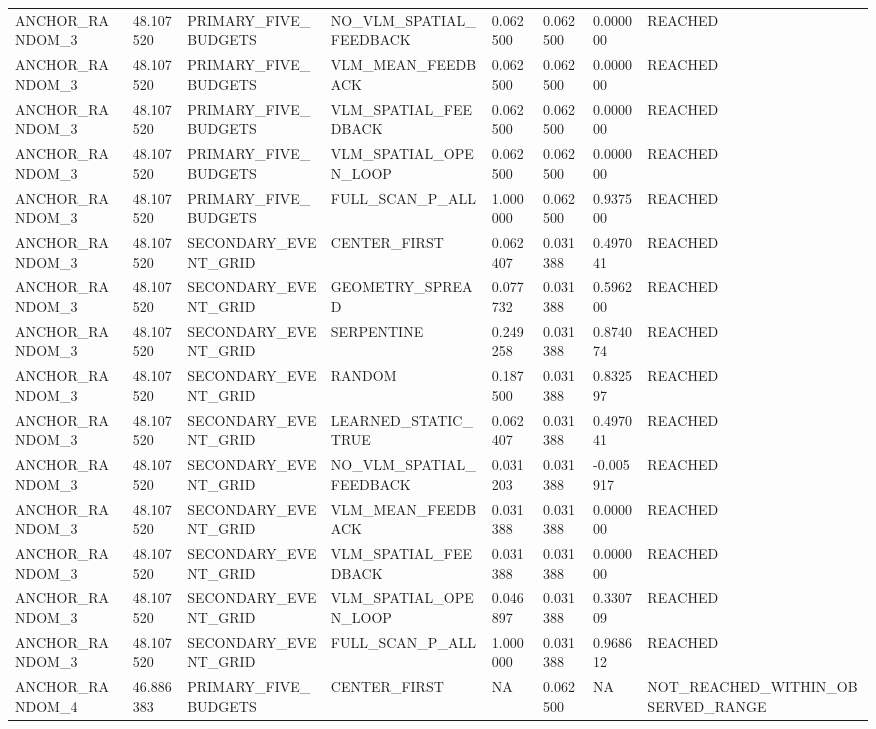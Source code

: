 \begin{tabular}{llllllll}
ANCHOR\_RANDOM\_3 & 48.107520 & PRIMARY\_FIVE\_BUDGETS & NO\_VLM\_SPATIAL\_FEEDBACK & 0.062500 & 0.062500 & 0.000000 & REACHED \\
ANCHOR\_RANDOM\_3 & 48.107520 & PRIMARY\_FIVE\_BUDGETS & VLM\_MEAN\_FEEDBACK & 0.062500 & 0.062500 & 0.000000 & REACHED \\
ANCHOR\_RANDOM\_3 & 48.107520 & PRIMARY\_FIVE\_BUDGETS & VLM\_SPATIAL\_FEEDBACK & 0.062500 & 0.062500 & 0.000000 & REACHED \\
ANCHOR\_RANDOM\_3 & 48.107520 & PRIMARY\_FIVE\_BUDGETS & VLM\_SPATIAL\_OPEN\_LOOP & 0.062500 & 0.062500 & 0.000000 & REACHED \\
ANCHOR\_RANDOM\_3 & 48.107520 & PRIMARY\_FIVE\_BUDGETS & FULL\_SCAN\_P\_ALL & 1.000000 & 0.062500 & 0.937500 & REACHED \\
ANCHOR\_RANDOM\_3 & 48.107520 & SECONDARY\_EVENT\_GRID & CENTER\_FIRST & 0.062407 & 0.031388 & 0.497041 & REACHED \\
ANCHOR\_RANDOM\_3 & 48.107520 & SECONDARY\_EVENT\_GRID & GEOMETRY\_SPREAD & 0.077732 & 0.031388 & 0.596200 & REACHED \\
ANCHOR\_RANDOM\_3 & 48.107520 & SECONDARY\_EVENT\_GRID & SERPENTINE & 0.249258 & 0.031388 & 0.874074 & REACHED \\
ANCHOR\_RANDOM\_3 & 48.107520 & SECONDARY\_EVENT\_GRID & RANDOM & 0.187500 & 0.031388 & 0.832597 & REACHED \\
ANCHOR\_RANDOM\_3 & 48.107520 & SECONDARY\_EVENT\_GRID & LEARNED\_STATIC\_TRUE & 0.062407 & 0.031388 & 0.497041 & REACHED \\
ANCHOR\_RANDOM\_3 & 48.107520 & SECONDARY\_EVENT\_GRID & NO\_VLM\_SPATIAL\_FEEDBACK & 0.031203 & 0.031388 & -0.005917 & REACHED \\
ANCHOR\_RANDOM\_3 & 48.107520 & SECONDARY\_EVENT\_GRID & VLM\_MEAN\_FEEDBACK & 0.031388 & 0.031388 & 0.000000 & REACHED \\
ANCHOR\_RANDOM\_3 & 48.107520 & SECONDARY\_EVENT\_GRID & VLM\_SPATIAL\_FEEDBACK & 0.031388 & 0.031388 & 0.000000 & REACHED \\
ANCHOR\_RANDOM\_3 & 48.107520 & SECONDARY\_EVENT\_GRID & VLM\_SPATIAL\_OPEN\_LOOP & 0.046897 & 0.031388 & 0.330709 & REACHED \\
ANCHOR\_RANDOM\_3 & 48.107520 & SECONDARY\_EVENT\_GRID & FULL\_SCAN\_P\_ALL & 1.000000 & 0.031388 & 0.968612 & REACHED \\
ANCHOR\_RANDOM\_4 & 46.886383 & PRIMARY\_FIVE\_BUDGETS & CENTER\_FIRST & NA & 0.062500 & NA & NOT\_REACHED\_WITHIN\_OBSERVED\_RANGE \\

\end{tabular}
